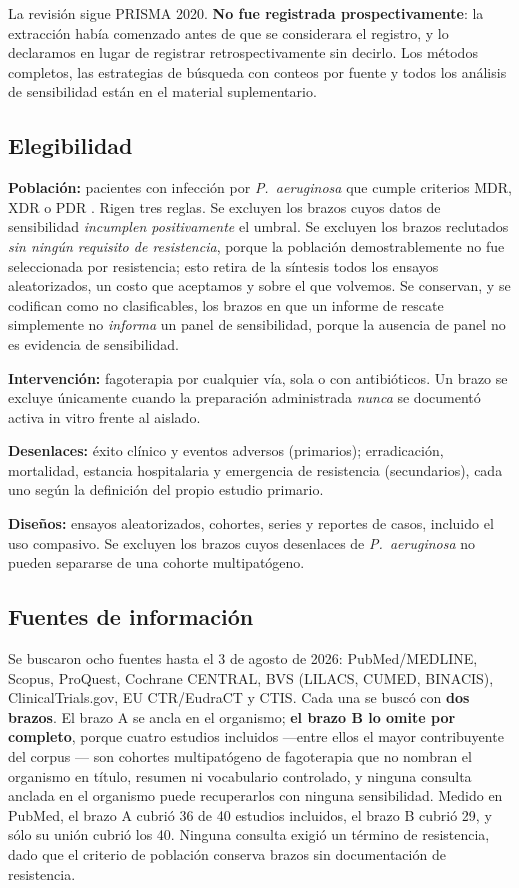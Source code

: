 \documentclass[12pt]{article}
\begin{document}
La revisión sigue PRISMA 2020. \textbf{No fue registrada prospectivamente}: la
extracción había comenzado antes de que se considerara el registro, y lo
declaramos en lugar de registrar retrospectivamente sin decirlo. Los métodos
completos, las estrategias de búsqueda con conteos por fuente y todos los
análisis de sensibilidad están en el material suplementario.

\subsection*{Elegibilidad}

\textbf{Población:} pacientes con infección por \textit{P.\ aeruginosa} que
cumple criterios MDR, XDR o PDR \parencite{Magiorakos2012_mdrxdr}. Rigen tres
reglas. Se excluyen los brazos cuyos datos de sensibilidad \emph{incumplen
positivamente} el umbral. Se excluyen los brazos reclutados \emph{sin ningún
requisito de resistencia}, porque la población demostrablemente no fue
seleccionada por resistencia; esto retira de la síntesis todos los ensayos
aleatorizados, un costo que aceptamos y sobre el que volvemos. Se conservan, y se
codifican como no clasificables, los brazos en que un informe de rescate
simplemente no \emph{informa} un panel de sensibilidad, porque la ausencia de
panel no es evidencia de sensibilidad.

\textbf{Intervención:} fagoterapia por cualquier vía, sola o con antibióticos. Un
brazo se excluye únicamente cuando la preparación administrada \emph{nunca} se
documentó activa in vitro frente al aislado.

\textbf{Desenlaces:} éxito clínico y eventos adversos (primarios); erradicación,
mortalidad, estancia hospitalaria y emergencia de resistencia (secundarios), cada
uno según la definición del propio estudio primario.

\textbf{Diseños:} ensayos aleatorizados, cohortes, series y reportes de casos,
incluido el uso compasivo. Se excluyen los brazos cuyos desenlaces de \textit{P.\
aeruginosa} no pueden separarse de una cohorte multipatógeno.

\subsection*{Fuentes de información}

Se buscaron ocho fuentes hasta el 3 de agosto de 2026: PubMed/MEDLINE, Scopus,
ProQuest, Cochrane CENTRAL, BVS (LILACS, CUMED, BINACIS), ClinicalTrials.gov, EU
CTR/EudraCT y CTIS. Cada una se buscó con \textbf{dos brazos}. El brazo A se
ancla en el organismo; \textbf{el brazo B lo omite por completo}, porque cuatro
estudios incluidos ---entre ellos el mayor contribuyente del corpus
\parencite{Pirnay2024_natmicrobiol}--- son cohortes multipatógeno de fagoterapia
que no nombran el organismo en título, resumen ni vocabulario controlado, y
ninguna consulta anclada en el organismo puede recuperarlos con ninguna
sensibilidad. Medido en PubMed, el brazo A cubrió 36 de 40 estudios incluidos, el
brazo B cubrió 29, y sólo su unión cubrió los 40. Ninguna consulta exigió un
término de resistencia, dado que el criterio de población conserva brazos sin
documentación de resistencia.
\end{document}
